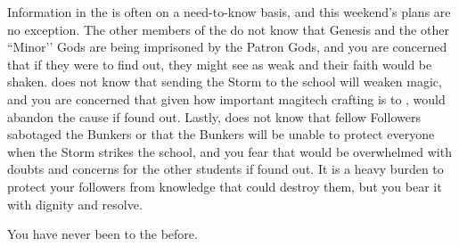 \documentclass[char]{GL2020}
\begin{document}
\begin{itemz}[Notes]
    \item Information in the \pGoaties{} is often on a need-to-know basis, and this weekend’s plans are no exception. The other members of the \pGoaties{} do not know that Genesis and the other ``Minor’’ Gods are being imprisoned by the Patron Gods, and you are concerned that if they were to find out, they might see \cGenesis{} as weak and their faith would be shaken. \cChupInventor{} does not know that sending the Storm to the school will weaken magic, and you are concerned that given how important magitech crafting is to \cChupInventor{\them}, \cChupInventor{\they} would abandon the cause if \cChupInventor{\they} found out. Lastly, \cChupStudent{} does not know that \cChupStudent{\their} fellow Followers sabotaged the Bunkers or that the Bunkers will be unable to protect everyone when the Storm strikes the school, and you fear that \cChupStudent{\they} would be overwhelmed with doubts and concerns for the other students if \cChupStudent{\they} found out. It is a heavy burden to protect your followers from knowledge that could destroy them, but you bear it with dignity and resolve.
    \item You have never been to the \pSchool{} before.
\end{itemz}
\end{document}
